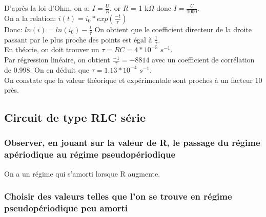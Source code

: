 \documentclass{scrartcl}
\begin{document}
			
			D'après la loi d'Ohm, on a: $I = \frac{U}{R}$, or $R$ = 1 k$\Omega$ donc $I = \frac{U}{1000}$.\\
			On a la relation: $i(t) = i_0 * exp\left(\frac{-t}{\tau}\right)$\\
			Donc: $ln(i) = ln(i_0) - \frac{t}{\tau}$
			On obtient que le coefficient directeur de la droite passant par le plus proche des points est égal à $\frac{1}{\tau}$.\\
			En théorie, on doit trouver un $\tau = RC = 4 * 10^{-5}$ $s^{-1}$.\\
			Par régression linéaire, on obtient $\frac{-1}{\tau} = -8814$ avec un coefficient de corrélation de 0.998. On en déduit que $\tau = 1.13 * 10^{-4}$ $s^{-1}$.\\
			On constate que la valeur théorique et expérimentale sont proches à un facteur 10 près.
			
			\subsection{Circuit de type RLC série}
			
				\subsubsection{Observer, en jouant sur la valeur de R, le passage du régime apériodique au régime pseudopériodique}
			
					On a un régime qui s'amorti lorsque R augmente.%
					
				\subsubsection{Choisir des valeurs telles que l'on se trouve en régime pseudopériodique peu amorti}
				
\end{document}
